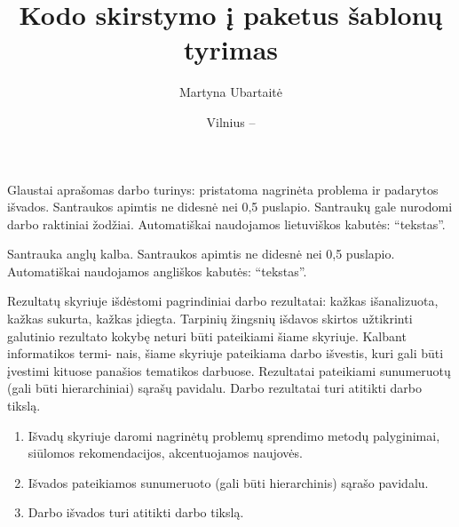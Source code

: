 \documentclass[
]{VUMIFPSbakalaurinis}
\title{Kodo skirstymo į paketus šablonų tyrimas}
\author{Martyna Ubartaitė}
\date{Vilnius – \the\year}
\begin{document}
\maketitle


\begin{lithuanian}
Glaustai aprašomas darbo turinys: pristatoma nagrinėta problema ir padarytos
išvados. Santraukos apimtis ne didesnė nei 0,5 puslapio. Santraukų gale
nurodomi darbo raktiniai žodžiai. Automatiškai naudojamos lietuviškos kabutės: \enquote{tekstas}.

\end{lithuanian}

\begin{english}
Santrauka anglų kalba. Santraukos apimtis ne didesnė nei 0,5 puslapio. Automatiškai naudojamos angliškos kabutės: \enquote{tekstas}.

\end{english}

\tableofcontents





%


Rezultatų skyriuje išdėstomi pagrindiniai darbo rezultatai: kažkas išanalizuota,
kažkas sukurta, kažkas įdiegta. Tarpinių žingsnių išdavos skirtos užtikrinti galutinio
rezultato kokybę neturi būti pateikiami šiame skyriuje. Kalbant informatikos termi-
nais, šiame skyriuje pateikiama darbo išvestis, kuri gali būti įvestimi kituose panašios
tematikos darbuose. Rezultatai pateikiami sunumeruotų (gali būti hierarchiniai) sąrašų
pavidalu. Darbo rezultatai turi atitikti darbo tikslą.

\begin{enumerate}[labelindent=0pt]
    \item Išvadų skyriuje daromi nagrinėtų problemų sprendimo metodų palyginimai, siūlomos
rekomendacijos, akcentuojamos naujovės.
    \item Išvados pateikiamos sunumeruoto (gali būti hierarchinis) sąrašo pavidalu.
    \item Darbo išvados turi atitikti darbo tikslą.
\end{enumerate}
\end{document}
